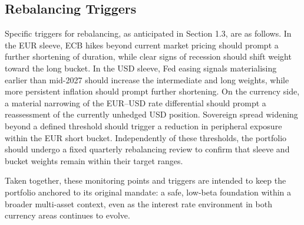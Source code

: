 \documentclass[11pt,a4paper]{article}
\begin{document}
\subsection{Rebalancing Triggers}

Specific triggers for rebalancing, as anticipated in Section 1.3, are as follows. In the EUR sleeve, ECB hikes beyond current market pricing should prompt a further shortening of duration, while clear signs of recession should shift weight toward the long bucket. In the USD sleeve, Fed easing signals materialising earlier than mid-2027 should increase the intermediate and long weights, while more persistent inflation should prompt further shortening. On the currency side, a material narrowing of the EUR--USD rate differential should prompt a reassessment of the currently unhedged USD position. Sovereign spread widening beyond a defined threshold should trigger a reduction in peripheral exposure within the EUR short bucket. Independently of these thresholds, the portfolio should undergo a fixed quarterly rebalancing review to confirm that sleeve and bucket weights remain within their target ranges.

Taken together, these monitoring points and triggers are intended to keep the portfolio anchored to its original mandate: a safe, low-beta foundation within a broader multi-asset context, even as the interest rate environment in both currency areas continues to evolve.

\clearpage
\end{document}
